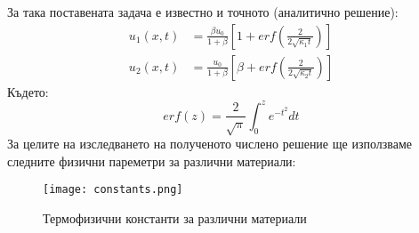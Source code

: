 За така поставената задача е известно и точното (аналитично решение):
\begin{align}
    u_{1}(x, t) &= \frac{\beta u_0}{1+\beta} \left[1 + erf(\frac{2}{2\sqrt{\kappa_1 t}})\right] \\
    u_{2}(x, t) &= \frac{u_0}{1+\beta} \left[\beta + erf(\frac{2}{2\sqrt{\kappa_2 t}})\right]  
\end{align}
Където: 
\begin{equation*}
    erf(z) = \frac{2}{\sqrt{\pi}} \displaystyle\int_{0}^{z} e ^{-t^2} dt
\end{equation*}
За целите на изследването на полученото числено решение ще използваме следните физични пареметри за различни материали:\\
\begin{figure}[h]
	\centering
	\texttt{[image: constants.png]}
	\caption{Термофизични константи за различни материали}
	\label{fig:constants}
\end{figure}

